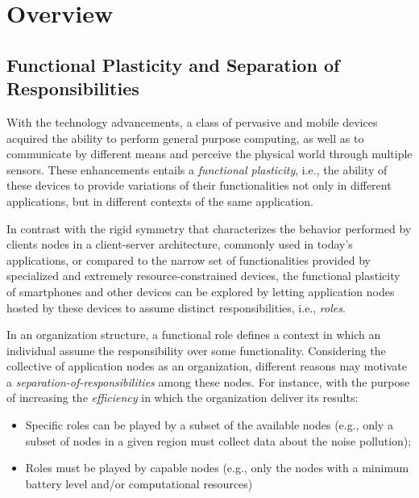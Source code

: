 
\section{Overview}\label{sec:overview}

\subsection{Functional Plasticity and Separation of Responsibilities}


With the technology advancements, a class of pervasive and mobile devices acquired the ability to perform general purpose computing, as well as to communicate by different means and perceive the physical world through multiple sensors. These enhancements entails a \textit{functional plasticity}, i.e., the ability of these devices to provide variations of their functionalities not only in different applications, but in different contexts of the same application. 

In contrast with the rigid symmetry that characterizes the behavior performed by clients nodes in a client-server architecture, commonly used in today's applications, or compared to the narrow set of functionalities provided by specialized and extremely resource-constrained devices, the functional plasticity of smartphones and other devices can be explored by letting application nodes hosted by these devices to assume distinct responsibilities, i.e., \textit{roles}.

In an organization structure, a functional role defines a context in which an individual assume the responsibility over some functionality. 
Considering the collective of application nodes as an organization, different reasons may motivate a \textit{separation-of-responsibilities} among these nodes. 
For instance, with the purpose of increasing the \textit{efficiency} in which the organization deliver its results:

\begin{itemize}
	\item Specific roles can be played by a subset of the available nodes (e.g., only a subset of nodes in a given region must collect data about the noise pollution);
	
	\item Roles must be played by capable nodes (e.g., only the nodes with a minimum battery level and/or computational resources)
\end{itemize}

